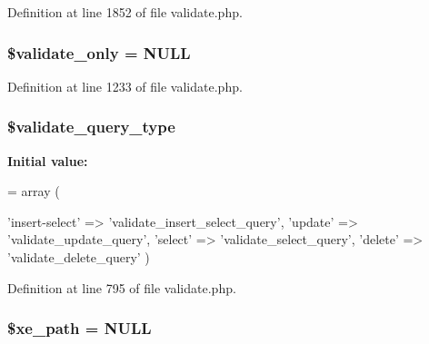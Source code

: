 Definition at line 1852 of file validate.\+php.

\hypertarget{validate_8php_a0e24775f133afa5748f8510c4a76f993}{
\subsubsection[{\$validate\+\_\+only}]{\setlength{\rightskip}{0pt plus 5cm}\$validate\+\_\+only = N\+U\+L\+L}}\label{validate_8php_a0e24775f133afa5748f8510c4a76f993}


Definition at line 1233 of file validate.\+php.

\hypertarget{validate_8php_a4dedc743cbf229659efcb0ad9f6c6cab}{
\subsubsection[{\$validate\+\_\+query\+\_\+type}]{\setlength{\rightskip}{0pt plus 5cm}\$validate\+\_\+query\+\_\+type}}\label{validate_8php_a4dedc743cbf229659efcb0ad9f6c6cab}
{\bfseries Initial value\+:}
\begin{DoxyCode}
= 
    array
        (
            
                            
                            
                            
            \textcolor{stringliteral}{'insert-select'} => \textcolor{stringliteral}{'validate\_insert\_select\_query'},
            \textcolor{stringliteral}{'update'} => \textcolor{stringliteral}{'validate\_update\_query'},
            \textcolor{stringliteral}{'select'} => \textcolor{stringliteral}{'validate\_select\_query'},
            \textcolor{stringliteral}{'delete'} => \textcolor{stringliteral}{'validate\_delete\_query'}
        )
\end{DoxyCode}


Definition at line 795 of file validate.\+php.

\hypertarget{validate_8php_aa5ad575ad128f7157c6336775537072e}{
\subsubsection[{\$xe\+\_\+path}]{\setlength{\rightskip}{0pt plus 5cm}\$xe\+\_\+path = N\+U\+L\+L}}\label{validate_8php_aa5ad575ad128f7157c6336775537072e}


